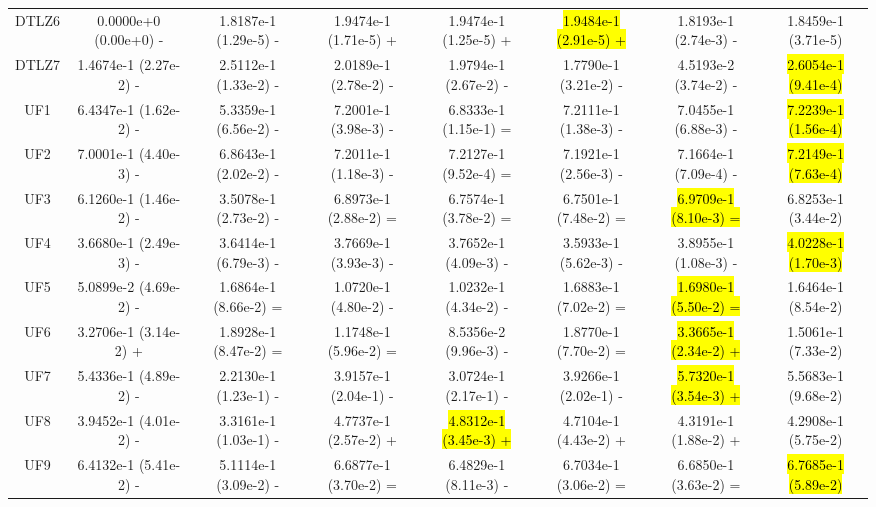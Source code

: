 \documentclass[journal]{IEEEtran}
\begin{document}
\begin{table}[tbp]
{\begin{tabular}{cccccccc}
      DTLZ6   & 0.0000e+0 (0.00e+0) -      & 1.8187e-1 (1.29e-5) -      & 1.9474e-1 (1.71e-5) +      & 1.9474e-1 (1.25e-5) +      & \hl{1.9484e-1 (2.91e-5) +} & 1.8193e-1 (2.74e-3) -      & 1.8459e-1 (3.71e-5)      \\
      DTLZ7   & 1.4674e-1 (2.27e-2) -      & 2.5112e-1 (1.33e-2) -      & 2.0189e-1 (2.78e-2) -      & 1.9794e-1 (2.67e-2) -      & 1.7790e-1 (3.21e-2) -      & 4.5193e-2 (3.74e-2) -      & \hl{2.6054e-1 (9.41e-4)} \\
      \hline
      UF1     & 6.4347e-1 (1.62e-2) -      & 5.3359e-1 (6.56e-2) -      & 7.2001e-1 (3.98e-3) -      & 6.8333e-1 (1.15e-1) =      & 7.2111e-1 (1.38e-3) -      & 7.0455e-1 (6.88e-3) -      & \hl{7.2239e-1 (1.56e-4)} \\
      UF2     & 7.0001e-1 (4.40e-3) -      & 6.8643e-1 (2.02e-2) -      & 7.2011e-1 (1.18e-3) -      & 7.2127e-1 (9.52e-4) =      & 7.1921e-1 (2.56e-3) -      & 7.1664e-1 (7.09e-4) -      & \hl{7.2149e-1 (7.63e-4)} \\
      UF3     & 6.1260e-1 (1.46e-2) -      & 3.5078e-1 (2.73e-2) -      & 6.8973e-1 (2.88e-2) =      & 6.7574e-1 (3.78e-2) =      & 6.7501e-1 (7.48e-2) =      & \hl{6.9709e-1 (8.10e-3) =} & 6.8253e-1 (3.44e-2)      \\
      UF4     & 3.6680e-1 (2.49e-3) -      & 3.6414e-1 (6.79e-3) -      & 3.7669e-1 (3.93e-3) -      & 3.7652e-1 (4.09e-3) -      & 3.5933e-1 (5.62e-3) -      & 3.8955e-1 (1.08e-3) -      & \hl{4.0228e-1 (1.70e-3)} \\
      UF5     & 5.0899e-2 (4.69e-2) -      & 1.6864e-1 (8.66e-2) =      & 1.0720e-1 (4.80e-2) -      & 1.0232e-1 (4.34e-2) -      & 1.6883e-1 (7.02e-2) =      & \hl{1.6980e-1 (5.50e-2) =} & 1.6464e-1 (8.54e-2)      \\
      UF6     & 3.2706e-1 (3.14e-2) +      & 1.8928e-1 (8.47e-2) =      & 1.1748e-1 (5.96e-2) =      & 8.5356e-2 (9.96e-3) -      & 1.8770e-1 (7.70e-2) =      & \hl{3.3665e-1 (2.34e-2) +} & 1.5061e-1 (7.33e-2)      \\
      UF7     & 5.4336e-1 (4.89e-2) -      & 2.2130e-1 (1.23e-1) -      & 3.9157e-1 (2.04e-1) -      & 3.0724e-1 (2.17e-1) -      & 3.9266e-1 (2.02e-1) -      & \hl{5.7320e-1 (3.54e-3) +} & 5.5683e-1 (9.68e-2)      \\
      UF8     & 3.9452e-1 (4.01e-2) -      & 3.3161e-1 (1.03e-1) -      & 4.7737e-1 (2.57e-2) +      & \hl{4.8312e-1 (3.45e-3) +} & 4.7104e-1 (4.43e-2) +      & 4.3191e-1 (1.88e-2) +      & 4.2908e-1 (5.75e-2)      \\
      UF9     & 6.4132e-1 (5.41e-2) -      & 5.1114e-1 (3.09e-2) -      & 6.6877e-1 (3.70e-2) =      & 6.4829e-1 (8.11e-3) -      & 6.7034e-1 (3.06e-2) =      & 6.6850e-1 (3.63e-2) =      & \hl{6.7685e-1 (5.89e-2)} \\

\end{tabular}}
\end{table}
\end{document}
